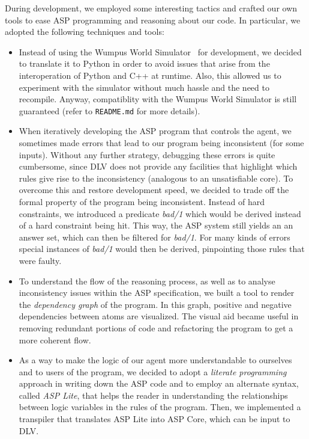 \documentclass{llncs}
\begin{document}
During development, we employed some interesting tactics and crafted our own tools to ease ASP programming and reasoning about our code. In particular, we adopted the following techniques and tools:

\begin{itemize}
	\item Instead of using the Wumpus World Simulator~\cite{WWS} for development, we decided to translate it to Python in order to avoid issues that arise from the interoperation of Python and C++ at runtime. Also, this allowed us to experiment with the simulator without much hassle and the need to recompile. Anyway, compatiblity with the Wumpus World Simulator is still guaranteed (refer to \texttt{README.md} for more details).
	\item When iteratively developing the ASP program that controls the agent, we sometimes made errors that lead to our program being inconsistent (for some inputs).
	Without any further strategy, debugging these errors is quite cumbersome, since DLV does not provide any facilities that highlight which rules give rise to the inconsistency (analogous to an unsatisfiable core).
	To overcome this and restore development speed, we decided to trade off the formal property of the program being inconsistent.
	Instead of hard constraints, we introduced a predicate \emph{bad/1} which would be derived instead of a hard constraint being hit.
	This way, the ASP system still yields an an answer set, which can then be filtered for \emph{bad/1}.
	For many kinds of errors special instances of \emph{bad/1} would then be derived, pinpointing those rules that were faulty.
	\item To understand the flow of the reasoning process, as well as to analyse inconsistency issues within the ASP specification, we built a tool to render the \emph{dependency graph} of the program.
	In this graph, positive and negative dependencies between atoms are visualized.
	The visual aid became useful in removing redundant portions of code and refactoring the program to get a more coherent flow.
	\item As a way to make the logic of our agent more understandable to ourselves and to users of the program, we decided to adopt a \emph{literate programming} approach in writing down the ASP code and to employ an alternate syntax, called \emph{ASP Lite}, that helps the reader in understanding the relationships between logic variables in the rules of the program.
	Then, we implemented a transpiler that translates ASP Lite into ASP Core, which can be input to DLV.
\end{itemize}
\end{document}
